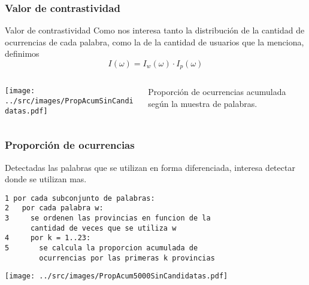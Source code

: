 \begin{frame}[t]\frametitle{Valor de contrastividad}
    \begin{block}{Valor de contrastividad}
    Como nos interesa tanto la distribución de la cantidad de ocurrencias de cada palabra, como la de la cantidad de usuarios que la menciona, definimos   
    \begin{equation}
    I(\omega) =  I_w (\omega) \cdot I_p(\omega)
    \label{eq:ivalor}
    \end{equation}
    \end{block}    

    \begin{columns}
        \begin{column}{.7\linewidth}
        \texttt{[image: ../src/images/PropAcumSinCandidatas.pdf]}
        \end{column}
        \begin{column}{.3\linewidth}
        Proporción de ocurrencias acumulada según la muestra de palabras. %
        \label{fig:propAcum}
        \end{column}
      \end{columns}
   

\end{frame}

\begin{frame}[fragile]\frametitle{Proporción de ocurrencias}
    Detectadas las palabras que se utilizan en forma diferenciada, interesa detectar donde se utilizan mas.

\begin{lstlisting}
1 por cada subconjunto de palabras:
2   por cada palabra w:
3     se ordenen las provincias en funcion de la 
      cantidad de veces que se utiliza w
4     por k = 1..23:
5       se calcula la proporcion acumulada de 
        ocurrencias por las primeras k provincias
\end{lstlisting}
\centering \texttt{[image: ../src/images/PropAcum5000SinCandidatas.pdf]}
        

\end{frame}